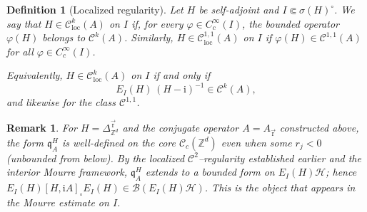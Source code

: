 \documentclass[10pt]{amsart}
\newcommand{\Z}{{\mathbb{Z}}}
\newcommand{\1}{{\mathbb{I}}}
\newcommand{\Bc}{\mathcal{B}}
\newcommand{\Cc}{\mathcal{C}}
\newcommand{\Hc}{\mathcal{H}}
\numberwithin{equation}{section}
\newtheorem{remark}[theorem]{Remark}%
\newtheorem{definition}[theorem]{Definition}%
\begin{document}
\begin{definition}[Localized regularity]
Let $H$ be self-adjoint and \(I\Subset\sigma(H)^\circ\).
We say that \(H\in\mathcal C^k_{\mathrm{loc}}(A)\) on \(I\) if, for every
\(\varphi\in C_c^\infty(I)\), the bounded operator \(\varphi(H)\)
belongs to \(\mathcal C^k(A)\).
Similarly, \(H\in\mathcal C^{1,1}_{\mathrm{loc}}(A)\) on \(I\)
if \(\varphi(H)\in\mathcal C^{1,1}(A)\) for all
\(\varphi\in C_c^\infty(I)\).

Equivalently, \(H\in\mathcal C^k_{\mathrm{loc}}(A)\) on \(I\)
if and only if
\[
E_I(H)\,(H-\mathrm i)^{-1}\in\mathcal C^k(A),
\]
and likewise for the class \(\mathcal C^{1,1}\).
\end{definition}

\begin{remark}
For $H=\Delta_{\Z^d}^{\vec{\mathrm{r}}}$ and the conjugate operator $A=A_{\vec{\mathrm{r}}}$ constructed above,
the form $\mathfrak q_A^H$ is well-defined on the core $\Cc_c(\Z^d)$ even when some $r_j<0$ (unbounded from below).
By the localized $\Cc^2$--regularity established earlier and the interior Mourre framework,
$\mathfrak q_A^H$ extends to a bounded form on $E_I(H)\Hc$; hence $E_I(H)[H,\mathrm i A]_\circ E_I(H)\in\Bc(E_I(H)\Hc)$.
This is the object that appears in the Mourre estimate on $I$.
\end{remark}
\end{document}
